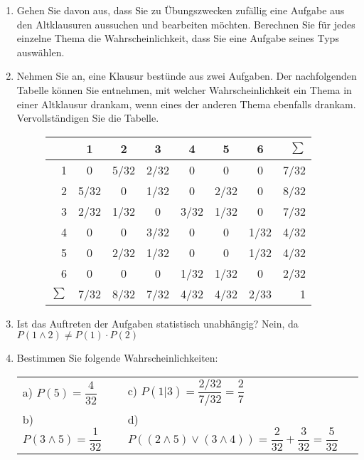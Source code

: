 \documentclass[11pt, a4paper]{article}
\begin{document}
\begin{enumerate}
\item Gehen Sie davon aus, dass Sie zu Übungszwecken zufällig eine Aufgabe aus den Altklausuren aussuchen und bearbeiten möchten. Berechnen Sie für jedes einzelne Thema die Wahrscheinlichkeit, dass Sie eine Aufgabe seines Typs auswählen.
\item Nehmen Sie an, eine Klausur bestünde aus zwei Aufgaben. Der nachfolgenden Tabelle können Sie entnehmen, mit welcher Wahrscheinlichkeit ein Thema in einer Altklausur drankam, wenn eines der anderen Thema ebenfalls drankam. Vervollständigen Sie die Tabelle.


\begin{figure}[h!]
\centering
\setlength\extrarowheight{5pt}
\begin{tabular}{r|cccccc|r}
	  		& 1 	& 2 	& 3 	& 4 	& 5 	& 6 	& $\sum$\\ \hline
	1 		& 0 	& 5/32 	& 2/32 	& 0  	& 0  	& 0 	& 7/32 \\
	2 		& 5/32	& 0		& 1/32 	& 0 	& 2/32 	& 0 	& 8/32 \\
	3 		& 2/32	& 1/32 	& 0 	& 3/32 	& 1/32 	& 0  	& 7/32 \\
	4 		& 0		& 0 	& 3/32 	& 0 	& 0  	& 1/32 	& 4/32 \\
	5 		& 0  	& 2/32 	& 1/32 	& 0 	& 0  	& 1/32 	& 4/32 \\
	6 		& 0 	& 0 	& 0  	& 1/32 	& 1/32 	& 0 	& 2/32 \\ \hline
	$\sum$ 	& 7/32 	& 8/32 	& 7/32 	& 4/32 	& 4/32 	& 2/33  & 1\\
\end{tabular}
\end{figure}

\item Ist das Auftreten der Aufgaben statistisch unabhängig? Nein, da $P(1 \land 2) \neq P(1) \cdot P(2)$
\item Bestimmen Sie folgende Wahrscheinlichkeiten:

	\begin{tabular}{ll}
	a) $P(5) = \dfrac{4}{32}$ \hspace{4cm} 				& c) $P(1|3) = \dfrac{2/32}{7/32} = \dfrac{2}{7}$ \\
	b) $P(3 \land 5) = \dfrac{1}{32}$ 					& d) $P((2 \land 5) \lor (3 \land 4)) = \dfrac{2}{32} + \dfrac{3}{32} = \dfrac{5}{32}$
	\end{tabular}

\end{enumerate}

\newpage
\end{document}
